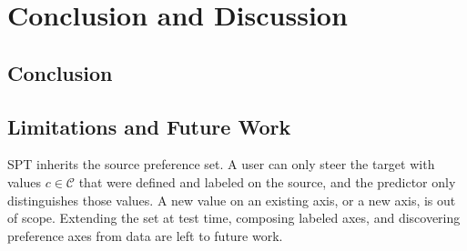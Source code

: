 \documentclass{article}
\begin{document}

\section{Conclusion and Discussion}
\label{sec:conclusion_discussion}

\subsection{Conclusion}
\label{sec:conclusion}

\subsection{Limitations and Future Work}
\label{sec:limitations}

SPT inherits the source preference set. A user can only steer the target with
values $c\in\mathcal{C}$ that were defined and labeled on the source, and the
predictor only distinguishes those values. A new value on an existing axis, or a
new axis, is out of scope. Extending the set at test time, composing labeled
axes, and discovering preference axes from data are left to future work.









\end{document}
